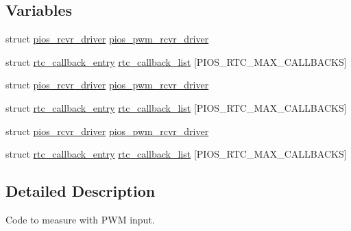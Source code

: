 \subsection*{\-Variables}
\begin{DoxyCompactItemize}
\item 
struct \hyperlink{structpios__rcvr__driver}{pios\-\_\-rcvr\-\_\-driver} \hyperlink{group___p_i_o_s___p_w_m_ga767a19a3a54afa71399b7467963690df}{pios\-\_\-pwm\-\_\-rcvr\-\_\-driver}
\item 
struct \hyperlink{structrtc__callback__entry}{rtc\-\_\-callback\-\_\-entry} \hyperlink{group___p_i_o_s___p_w_m_ga4cb0707cdd245f2578d3f444bd852fd7}{rtc\-\_\-callback\-\_\-list} \mbox{[}\-P\-I\-O\-S\-\_\-\-R\-T\-C\-\_\-\-M\-A\-X\-\_\-\-C\-A\-L\-L\-B\-A\-C\-K\-S\mbox{]}
\item 
struct \hyperlink{structpios__rcvr__driver}{pios\-\_\-rcvr\-\_\-driver} \hyperlink{group___p_i_o_s___p_w_m_ga767a19a3a54afa71399b7467963690df}{pios\-\_\-pwm\-\_\-rcvr\-\_\-driver}
\item 
struct \hyperlink{structrtc__callback__entry}{rtc\-\_\-callback\-\_\-entry} \hyperlink{group___p_i_o_s___p_w_m_ga4cb0707cdd245f2578d3f444bd852fd7}{rtc\-\_\-callback\-\_\-list} \mbox{[}\-P\-I\-O\-S\-\_\-\-R\-T\-C\-\_\-\-M\-A\-X\-\_\-\-C\-A\-L\-L\-B\-A\-C\-K\-S\mbox{]}
\item 
struct \hyperlink{structpios__rcvr__driver}{pios\-\_\-rcvr\-\_\-driver} \hyperlink{group___p_i_o_s___p_w_m_ga767a19a3a54afa71399b7467963690df}{pios\-\_\-pwm\-\_\-rcvr\-\_\-driver}
\item 
struct \hyperlink{structrtc__callback__entry}{rtc\-\_\-callback\-\_\-entry} \hyperlink{group___p_i_o_s___p_w_m_ga4cb0707cdd245f2578d3f444bd852fd7}{rtc\-\_\-callback\-\_\-list} \mbox{[}\-P\-I\-O\-S\-\_\-\-R\-T\-C\-\_\-\-M\-A\-X\-\_\-\-C\-A\-L\-L\-B\-A\-C\-K\-S\mbox{]}
\end{DoxyCompactItemize}


\subsection{\-Detailed \-Description}
\-Code to measure with \-P\-W\-M input. 

